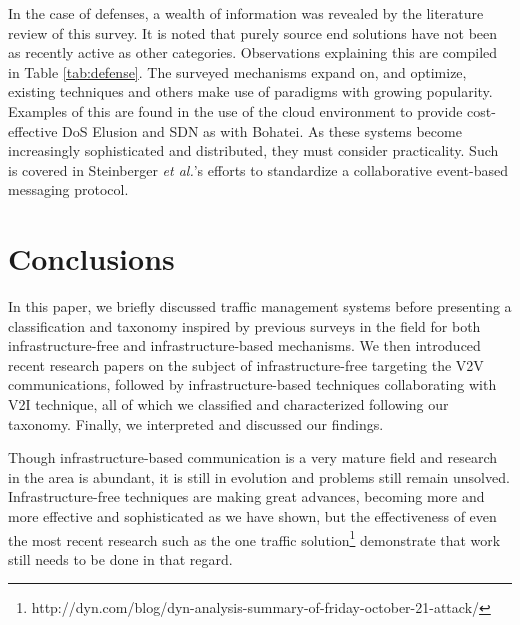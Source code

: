 \documentclass[conference]{IEEEtran}
\begin{document}
In the case of defenses, a wealth of information was revealed by the literature review of this survey. It is noted that purely source end solutions have not been as recently active as other categories. Observations explaining this are compiled in Table \ref{tab:defense}. The surveyed mechanisms expand on, and optimize, existing techniques and others make use of paradigms with growing popularity. Examples of this are found in the use of the cloud environment to provide cost-effective DoS Elusion and SDN as with Bohatei. As these systems become increasingly sophisticated and distributed, they must consider practicality. Such is covered in Steinberger \textit{et al.}'s efforts to standardize a collaborative event-based messaging protocol.




\section{Conclusions}
In this paper, we briefly discussed traffic management systems  before presenting a classification and taxonomy inspired by previous surveys in the field for both infrastructure-free and infrastructure-based mechanisms. We then introduced recent research papers on the subject of infrastructure-free targeting the V2V communications, followed by infrastructure-based techniques collaborating with V2I technique, all of which we classified and characterized following our taxonomy. Finally, we interpreted and discussed our findings.

Though infrastructure-based communication is a very mature field and research in the area is abundant, it is still in evolution and problems still remain unsolved. Infrastructure-free techniques are making great advances, becoming more and more effective and sophisticated as we have shown, but the effectiveness of even the most recent research such as the one traffic solution\footnote{http://dyn.com/blog/dyn-analysis-summary-of-friday-october-21-attack/} demonstrate that work still needs to be done in that regard.



\end{document}
